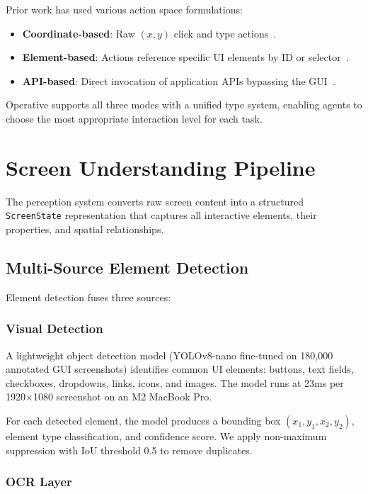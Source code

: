 \documentclass[11pt,twocolumn]{article}
\begin{document}
Prior work has used various action space formulations:

\begin{itemize}[leftmargin=*]
    \item \textbf{Coordinate-based}: Raw $(x, y)$ click and type actions~\cite{anthropic2024computer}.
    \item \textbf{Element-based}: Actions reference specific UI elements by ID or selector~\cite{he2024webvoyager}.
    \item \textbf{API-based}: Direct invocation of application APIs bypassing the GUI~\cite{wang2024mobile}.
\end{itemize}

Operative supports all three modes with a unified type system, enabling agents to choose the most appropriate interaction level for each task.

\section{Screen Understanding Pipeline}
\label{sec:perception}

The perception system converts raw screen content into a structured \texttt{ScreenState} representation that captures all interactive elements, their properties, and spatial relationships.

\subsection{Multi-Source Element Detection}

Element detection fuses three sources:

\subsubsection{Visual Detection}

A lightweight object detection model (YOLOv8-nano fine-tuned on 180,000 annotated GUI screenshots) identifies common UI elements: buttons, text fields, checkboxes, dropdowns, links, icons, and images. The model runs at 23ms per 1920$\times$1080 screenshot on an M2 MacBook Pro.

For each detected element, the model produces a bounding box $(x_1, y_1, x_2, y_2)$, element type classification, and confidence score. We apply non-maximum suppression with IoU threshold 0.5 to remove duplicates.

\subsubsection{OCR Layer}
\end{document}

